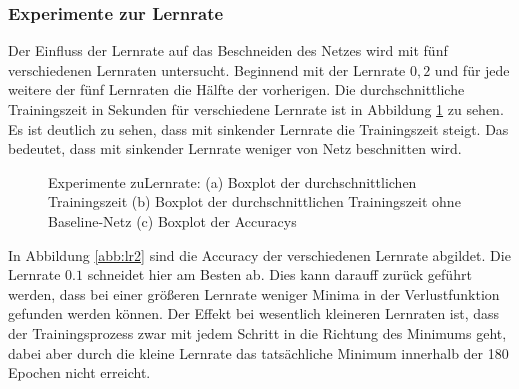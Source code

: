 \subsubsection{Experimente zur Lernrate}
Der Einfluss der Lernrate auf das Beschneiden des Netzes wird mit fünf verschiedenen Lernraten untersucht. Beginnend mit der Lernrate $0,2$ und für jede weitere der fünf Lernraten die Hälfte der vorherigen.
Die durchschnittliche Trainingszeit in Sekunden für verschiedene Lernrate ist in Abbildung \ref{abb:lr} zu sehen. Es ist deutlich zu sehen, dass mit sinkender Lernrate die Trainingszeit steigt. Das bedeutet, dass mit sinkender Lernrate weniger von Netz beschnitten wird.
 
 \begin{figure}
     \centering
     \hfill
     \caption{Experimente zuLernrate: (a) Boxplot der durchschnittlichen Trainingszeit (b) Boxplot der durchschnittlichen Trainingszeit ohne Baseline-Netz (c) Boxplot der Accuracys}
     \label{abb:lr}
\end{figure}

 In Abbildung \ref{abb:lr2} sind die Accuracy der verschiedenen Lernrate abgildet. Die Lernrate $0.1$ schneidet hier am Besten ab. Dies kann darauff zurück geführt werden, dass bei einer größeren Lernrate weniger Minima in der Verlustfunktion gefunden werden können. Der Effekt bei wesentlich kleineren Lernraten ist, dass der Trainingsprozess zwar mit jedem Schritt in die Richtung des Minimums geht, dabei aber durch die kleine Lernrate das tatsächliche Minimum innerhalb der 180 Epochen nicht erreicht.
 
